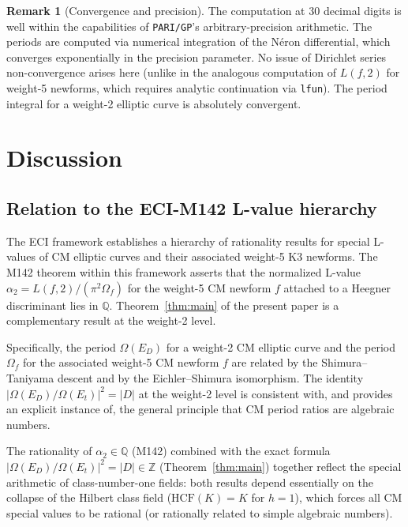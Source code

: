 \documentclass[12pt,a4paper]{article}
\theoremstyle{plain}
\theoremstyle{definition}
\newtheorem{remark}[theorem]{Remark}
\newcommand{\Q}{\mathbb{Q}}
\newcommand{\Z}{\mathbb{Z}}
\begin{document}
\begin{remark}[Convergence and precision]
The computation at 30 decimal digits is well within the capabilities of
\texttt{PARI/GP}'s arbitrary-precision arithmetic.  The periods are computed
via numerical integration of the N\'eron differential, which converges
exponentially in the precision parameter.  No issue of Dirichlet series
non-convergence arises here (unlike in the analogous computation of $L(f, 2)$
for weight-5 newforms, which requires analytic continuation via
\texttt{lfun}).  The period integral for a weight-2 elliptic curve is
absolutely convergent.
\end{remark}

\section{Discussion}
\label{sec:discussion}

\subsection{Relation to the ECI-M142 L-value hierarchy}

The ECI framework \cite{Kriz1805.03605} establishes a hierarchy of
rationality results for special L-values of CM elliptic curves and their
associated weight-5 K3 newforms.  The M142 theorem within this framework
asserts that the normalized L-value $\alpha_2 = L(f, 2)/(\pi^2 \Omega_f)$
for the weight-5 CM newform $f$ attached to a Heegner discriminant lies in
$\Q$.  Theorem~\ref{thm:main} of the present paper is a complementary result
at the weight-2 level.

Specifically, the period $\Omega(E_D)$ for a weight-2 CM elliptic curve
and the period $\Omega_f$ for the associated weight-5 CM newform $f$ are
related by the Shimura--Taniyama descent and by the Eichler--Shimura
isomorphism.  The identity $|\Omega(E_D)/\Omega(E_t)|^2 = |D|$ at the
weight-2 level is consistent with, and provides an explicit instance of,
the general principle that CM period ratios are algebraic numbers.

The rationality of $\alpha_2 \in \Q$ (M142) combined with the exact formula
$|\Omega(E_D)/\Omega(E_t)|^2 = |D| \in \Z$ (Theorem~\ref{thm:main})
together reflect the special arithmetic of class-number-one fields: both
results depend essentially on the collapse of the Hilbert class field
($\mathrm{HCF}(K) = K$ for $h = 1$), which forces all CM special values
to be rational (or rationally related to simple algebraic numbers).
\end{document}
